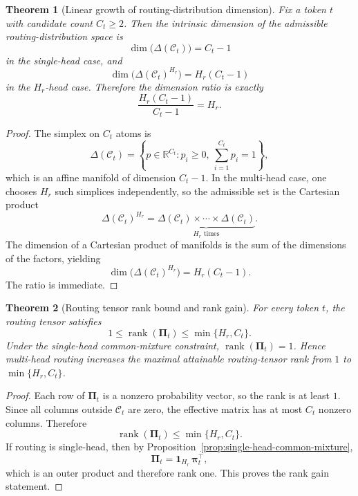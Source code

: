 \documentclass{article}
\theoremstyle{plain}
\newtheorem{theorem}{Theorem}[section]
\theoremstyle{definition}
\theoremstyle{remark}
\begin{document}
\begin{theorem}[Linear growth of routing-distribution dimension]
\label{thm:routing-dimension-growth}
Fix a token $t$ with candidate count $C_{t}\ge 2$. Then the intrinsic dimension of the admissible routing-distribution space is
\begin{equation}
\label{eq:single-head-dim}
\dim\bigl(\Delta(\mathcal{C}_{t})\bigr) = C_{t}-1
\end{equation}
in the single-head case, and
\begin{equation}
\label{eq:multi-head-dim}
\dim\bigl(\Delta(\mathcal{C}_{t})^{H_r}\bigr)=H_r(C_{t}-1)
\end{equation}
in the $H_r$-head case. Therefore the dimension ratio is exactly
\begin{equation}
\label{eq:dim-ratio-routing}
\frac{H_r(C_{t}-1)}{C_{t}-1}=H_r.
\end{equation}
\end{theorem}

\begin{proof}
The simplex on $C_{t}$ atoms is
\[
\Delta(\mathcal{C}_{t})
=
\left\{
p\in \mathbb{R}^{C_{t}}:
p_i\ge 0,\ \sum_{i=1}^{C_{t}}p_i=1
\right\},
\]
which is an affine manifold of dimension $C_{t}-1$. In the multi-head case, one chooses $H_r$ such simplices independently, so the admissible set is the Cartesian product
\[
\Delta(\mathcal{C}_{t})^{H_r}
=
\underbrace{\Delta(\mathcal{C}_{t})\times \cdots \times \Delta(\mathcal{C}_{t})}_{H_r\text{ times}}.
\]
The dimension of a Cartesian product of manifolds is the sum of the dimensions of the factors, yielding
\[
\dim\bigl(\Delta(\mathcal{C}_{t})^{H_r}\bigr)
=
H_r(C_{t}-1).
\]
The ratio is immediate.
\end{proof}

\begin{theorem}[Routing tensor rank bound and rank gain]
\label{thm:routing-rank-gain}
For every token $t$, the routing tensor satisfies
\begin{equation}
\label{eq:rank-bound-routing}
1 \le \operatorname{rank}(\boldsymbol{\Pi}_{t})
\le
\min\{H_r,C_{t}\}.
\end{equation}
Under the single-head common-mixture constraint, $\operatorname{rank}(\boldsymbol{\Pi}_{t})=1$. Hence multi-head routing increases the maximal attainable routing-tensor rank from $1$ to $\min\{H_r,C_{t}\}$.
\end{theorem}

\begin{proof}
Each row of $\boldsymbol{\Pi}_{t}$ is a nonzero probability vector, so the rank is at least $1$. Since all columns outside $\mathcal{C}_{t}$ are zero, the effective matrix has at most $C_{t}$ nonzero columns. Therefore
\[
\operatorname{rank}(\boldsymbol{\Pi}_{t})
\le \min\{H_r,C_{t}\}.
\]
If routing is single-head, then by Proposition~\ref{prop:single-head-common-mixture},
\[
\boldsymbol{\Pi}_{t}
=
\mathbf{1}_{H_r}\,\boldsymbol{\pi}_{t}^{\top},
\]
which is an outer product and therefore rank one. This proves the rank gain statement.
\end{proof}
\end{document}
